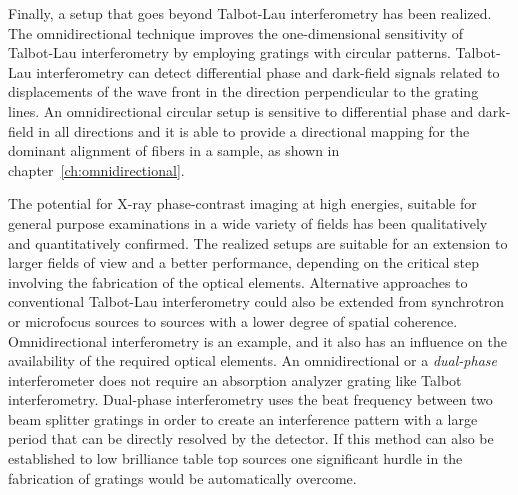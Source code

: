 Finally, a setup that goes beyond Talbot-Lau interferometry has been
realized. The omnidirectional technique improves the one-dimensional
sensitivity of Talbot-Lau interferometry by employing gratings with circular
patterns. Talbot-Lau interferometry can detect differential phase and
dark-field signals related to displacements of the wave front in the
direction perpendicular to the grating lines. An omnidirectional circular
setup is sensitive to differential phase and dark-field in all directions
and it is able to provide a directional mapping for the
dominant alignment of fibers in a sample, as shown in
chapter~\ref{ch:omnidirectional}.

The potential for X-ray phase-contrast imaging at high energies, suitable
for general purpose examinations in a wide variety of fields has been
qualitatively and quantitatively confirmed. The realized setups are suitable
for an extension to larger fields of view and a better performance,
depending on the critical step involving the fabrication of the optical
elements.
Alternative approaches to conventional Talbot-Lau interferometry could also be extended
from synchrotron or microfocus sources to sources with a lower degree of
spatial coherence. Omnidirectional interferometry is an example, and it also
has an influence on the availability of
the required optical elements. An omnidirectional or a \emph{dual-phase}
interferometer does not require an absorption analyzer grating like Talbot
interferometry. Dual-phase interferometry uses
the beat frequency between two beam splitter gratings in order to create an
interference pattern with a large period that can be directly resolved by
the detector. If this method can also be established to low brilliance table top
sources one significant hurdle in the fabrication of gratings would be
automatically overcome.
